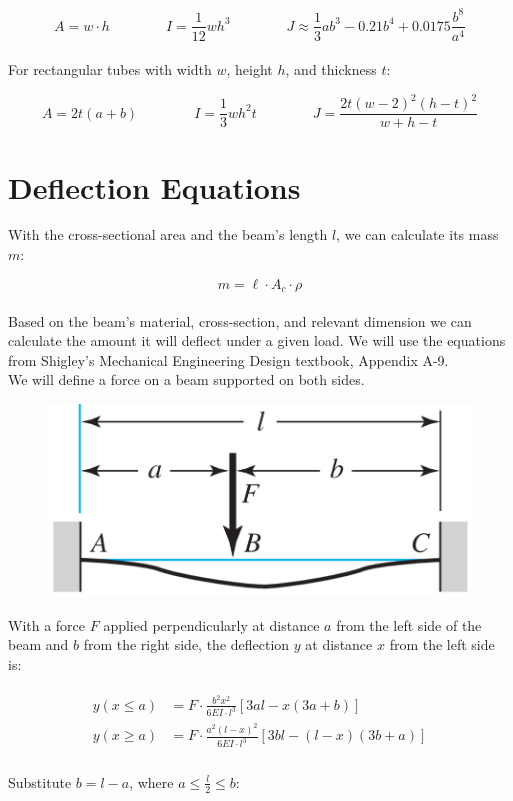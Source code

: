 \documentclass[a4paper]{article}
\begin{document}
	\begin{equation}
		A = w \cdot h \qquad\qquad
		I = \frac{1}{12} w h^3 \qquad\qquad
		J \approx \frac{1}{3} a b^3 - 0.21 b^4 + 0.0175 \frac{b^8}{a^4}
	\end{equation}
	\\
	For rectangular tubes with width $ w $, height $ h $, and thickness $ t $:
	
	\begin{equation}
		A = 2t(a+b) \qquad\qquad
		I = \frac{1}{3} w h^2 t \qquad\qquad
		J = \frac{2t (w-2)^2 (h-t)^2}{w + h - t}
	\end{equation}
	
	
	\section*{Deflection Equations}
	
	With the cross-sectional area and the beam's length $ l $, we can calculate its mass $ m $:
	
	\begin{equation}
		m = \ell \cdot A_c \cdot \rho
	\end{equation}
	\\
	Based on the beam's material, cross-section, and relevant dimension we can calculate the amount it will deflect under a given load. We will use the equations from Shigley's Mechanical Engineering Design textbook, Appendix A-9.\\
	
	\newpage
	We will define a force on a beam supported on both sides.
	
	\begin{figure}[H]
		\centering
		\includegraphics[width=0.7\linewidth]{beam_bend_btwn}
	\end{figure}
	
	With a force $ F $ applied perpendicularly at distance $ a $ from the left side of the beam and $ b $ from the right side, the deflection $ y $ at distance $ x $ from the left side is:
	
	\begin{gather}
	\begin{aligned}
		y\left( x \leq a \right) &= F \cdot \frac{b^2 x^2}{6 EI \cdot l^3} \left[ 3a l - x \left( 3a+b \right) \right] \\
		y\left( x \geq a \right) &= F \cdot \frac{a^2 \left( l - x \right)^2}{6 EI \cdot l^3} \left[ 3b l - \left( l - x \right) \left( 3b+a \right) \right]
	\end{aligned}
	\end{gather}
	\\
	Substitute $ b = l - a $, where $ a \leq \frac{l}{2} \leq b $:
	
\end{document}

